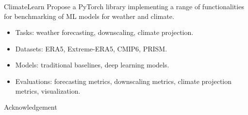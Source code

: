 \documentclass[12pt,aspectratio=169]{beamer}
\begin{document}
\begin{frame}{ClimateLearn}
  Propose a PyTorch library implementing a range of functionalities for benchmarking of ML models for
  weather and climate.
  \begin{itemize}
    \item Tasks: weather forecasting, downscaling, climate projection.
    \item Datasets: ERA5, Extreme-ERA5, CMIP6, PRISM.
    \item Models: traditional baselines, deep learning models.
    \item Evaluations: forecasting metrics, downscaling metrics, climate projection metrics, visualization.
  \end{itemize}
\end{frame}

\begin{frame}{Acknowledgement}
  \begin{center}
    \textcolor{gray}{\Huge{\centerline{}}}
  \end{center}
\end{frame}
\end{document}
